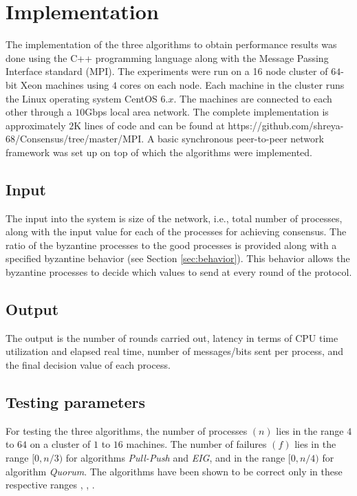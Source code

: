 ﻿\section{Implementation}
\label{sec:eval}

The implementation of the three algorithms to obtain performance results
was done using the C++ programming language along with the Message
Passing Interface standard (MPI).  The experiments were run on a 16 node
cluster of $64$-bit Xeon machines using $4$ cores on each node.
Each machine in the cluster runs the Linux operating system CentOS $6.x$.
The machines are connected to each other through a $10$Gbps local area
network. The complete implementation is approximately $2$K lines of code
and can be found at
https://github.com/shreya-68/Consensus/tree/master/MPI. A basic
synchronous peer-to-peer network framework was set up on top of which
the algorithms were implemented.

\subsection{Input}
The input into the system is size of the network, i.e., total number of processes, along with the input value for each of the processes for achieving consensus. The ratio of the byzantine processes to the good processes is provided along with a specified byzantine behavior (see Section \ref{sec:behavior}). This behavior allows the byzantine processes to decide which values to send at every round of the protocol. 

\subsection{Output}
The output is the number of rounds carried out, latency in terms of CPU time utilization and elapsed real time, number of messages/bits sent per process, and the final decision value of each process. 

\subsection{Testing parameters}
For testing the three algorithms, the number of processes $(n)$ lies in the range $4$ to $64$ on a cluster of $1$ to $16$ machines. The number of failures $(f)$ lies in the range $[0, n/3)$ for algorithms \textit{Pull-Push} and \textit{EIG}, and in the range $[0, n/4)$ for algorithm \textit{Quorum}. The algorithms have been shown to be correct only in these respective ranges \cite{BGH13}, \cite{KM13}, \cite{BPV06}. 

